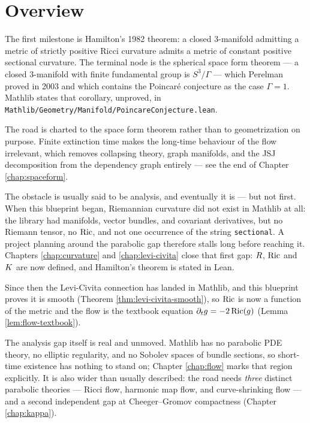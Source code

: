 \chapter{Overview}

The first milestone is Hamilton's 1982 theorem: a closed $3$-manifold admitting
a metric of strictly positive Ricci curvature admits a metric of constant
positive sectional curvature. The terminal node is the spherical space form
theorem --- a closed $3$-manifold with finite fundamental group is
$S^3/\Gamma$ --- which Perelman proved in 2003 and which contains the
Poincar\'e conjecture as the case $\Gamma = 1$. Mathlib states that corollary,
unproved, in \texttt{Mathlib/Geometry/Manifold/PoincareConjecture.lean}.

The road is charted to the space form theorem rather than to geometrization on
purpose. Finite extinction time makes the long-time behaviour of the flow
irrelevant, which removes collapsing theory, graph manifolds, and the JSJ
decomposition from the dependency graph entirely --- see the end of Chapter
\ref{chap:spaceform}.

The obstacle is usually said to be analysis, and eventually it is --- but not
first. When this blueprint began, Riemannian curvature did not exist in Mathlib
at all: the library had manifolds, vector bundles, and covariant derivatives,
but no Riemann tensor, no $\operatorname{Ric}$, and not one occurrence of the string
\texttt{sectional}. A project planning around the parabolic gap therefore
stalls long before reaching it. Chapters \ref{chap:curvature} and
\ref{chap:levi-civita} close that first gap: $R$, $\operatorname{Ric}$ and $K$ are
now defined, and Hamilton's theorem is stated in Lean.

Since then the Levi-Civita connection has landed in Mathlib, and this
blueprint proves it is smooth (Theorem \ref{thm:levi-civita-smooth}), so
$\operatorname{Ric}$ is now a function of the metric and the flow is the textbook equation
$\partial_t g = -2\operatorname{Ric}(g)$ (Lemma \ref{lem:flow-textbook}).

The analysis gap itself is real and unmoved. Mathlib has no parabolic PDE
theory, no elliptic regularity, and no Sobolev spaces of bundle sections, so
short-time existence has nothing to stand on; Chapter \ref{chap:flow} marks
that region explicitly. It is also wider than usually described: the road needs
\emph{three} distinct parabolic theories --- Ricci flow, harmonic map flow, and
curve-shrinking flow --- and a second independent gap at Cheeger--Gromov
compactness (Chapter \ref{chap:kappa}).

